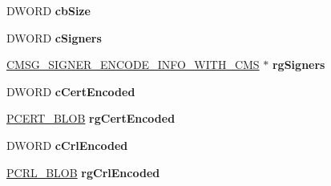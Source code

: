 \begin{DoxyCompactItemize}
\item 
\mbox{\label{struct___c_m_s_g___s_i_g_n_e_d___e_n_c_o_d_e___i_n_f_o___w_i_t_h___c_m_s_af4d40c94841a4c4a761ed9411d27fd6a}} 
D\+W\+O\+RD {\bfseries cb\+Size}
\item 
\mbox{\label{struct___c_m_s_g___s_i_g_n_e_d___e_n_c_o_d_e___i_n_f_o___w_i_t_h___c_m_s_a282a3336a2cd71fd4cadf4f918901429}} 
D\+W\+O\+RD {\bfseries c\+Signers}
\item 
\mbox{\label{struct___c_m_s_g___s_i_g_n_e_d___e_n_c_o_d_e___i_n_f_o___w_i_t_h___c_m_s_ae6dbb72031b59ba68d4b02eb31d9b8d4}} 
\hyperlink{struct___c_m_s_g___s_i_g_n_e_r___e_n_c_o_d_e___i_n_f_o___w_i_t_h___c_m_s}{C\+M\+S\+G\+\_\+\+S\+I\+G\+N\+E\+R\+\_\+\+E\+N\+C\+O\+D\+E\+\_\+\+I\+N\+F\+O\+\_\+\+W\+I\+T\+H\+\_\+\+C\+MS} $\ast$ {\bfseries rg\+Signers}
\item 
\mbox{\label{struct___c_m_s_g___s_i_g_n_e_d___e_n_c_o_d_e___i_n_f_o___w_i_t_h___c_m_s_ab3c68e5ed30e822c29a47e58f9128a22}} 
D\+W\+O\+RD {\bfseries c\+Cert\+Encoded}
\item 
\mbox{\label{struct___c_m_s_g___s_i_g_n_e_d___e_n_c_o_d_e___i_n_f_o___w_i_t_h___c_m_s_a392bd5b0448ddc9b00d12c9bf1ecc17f}} 
\hyperlink{struct___c_r_y_p_t_o_a_p_i___b_l_o_b}{P\+C\+E\+R\+T\+\_\+\+B\+L\+OB} {\bfseries rg\+Cert\+Encoded}
\item 
\mbox{\label{struct___c_m_s_g___s_i_g_n_e_d___e_n_c_o_d_e___i_n_f_o___w_i_t_h___c_m_s_a7ca6b345455cdf0ff57877b59d21a0de}} 
D\+W\+O\+RD {\bfseries c\+Crl\+Encoded}
\item 
\mbox{\label{struct___c_m_s_g___s_i_g_n_e_d___e_n_c_o_d_e___i_n_f_o___w_i_t_h___c_m_s_a25ec149f1c56c0d57a239594bde1de33}} 
\hyperlink{struct___c_r_y_p_t_o_a_p_i___b_l_o_b}{P\+C\+R\+L\+\_\+\+B\+L\+OB} {\bfseries rg\+Crl\+Encoded}

\end{DoxyCompactItemize}
